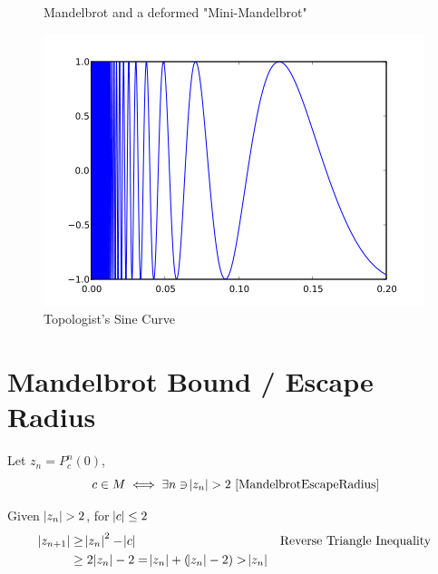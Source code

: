 \documentclass{article}
\begin{document}
\begin{figure}[!htbp]
    \centering
    \caption{Mandelbrot \cite{NormalMandelbrot} and a deformed "Mini-Mandelbrot" \cite{MiniMandelbrot}} %
    \label{fig:MandelbrotSet}%
\end{figure}%

\begin{figure}[!htbp]
    \centering
    \includegraphics[width=.4\linewidth]{images/420px-Topologist_sine_curve.png}
    \caption{Topologist's Sine Curve \cite{TopSineCurve}}%
\end{figure}



\section{Mandelbrot Bound / Escape Radius}

Let $z_n = P_c^n(0)$,
\[ c \in M \iff \exists n \ni \abs{z_n} > 2\ \text{\cite{MandelbrotEscapeRadius}}\]

Given $\abs{z_n} > 2$, for $\abs{c} \leq 2$
\begin{align*}
    \abs{z_{n+1}} &\geq \abs{z_n}^2 - \abs{c} &&\text{Reverse Triangle Inequality} \\
    &\geq 2\abs{z_n} - 2 = \abs{z_n} + (\abs{z_n} - 2) > \abs{z_n}
\end{align*}
\end{document}
